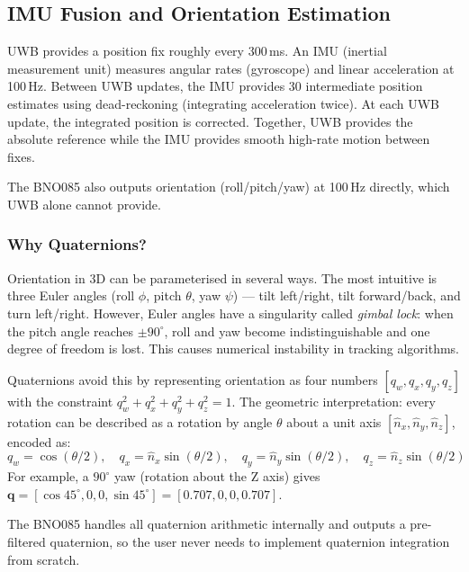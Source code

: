 \documentclass[11pt,a4paper]{article}
\newcommand{\vect}[1]{\bm{#1}}
\begin{document}
\subsection{IMU Fusion and Orientation Estimation}

\begin{intubox}
UWB provides a position fix roughly every 300\,ms. An IMU (inertial measurement unit) measures angular rates (gyroscope) and linear acceleration at 100\,Hz. Between UWB updates, the IMU provides 30 intermediate position estimates using dead-reckoning (integrating acceleration twice). At each UWB update, the integrated position is corrected. Together, UWB provides the absolute reference while the IMU provides smooth high-rate motion between fixes.

The BNO085 also outputs orientation (roll/pitch/yaw) at 100\,Hz directly, which UWB alone cannot provide.
\end{intubox}

\subsubsection{Why Quaternions?}

Orientation in 3D can be parameterised in several ways. The most intuitive is three Euler angles (roll $\phi$, pitch $\theta$, yaw $\psi$) --- tilt left/right, tilt forward/back, and turn left/right. However, Euler angles have a singularity called \emph{gimbal lock}: when the pitch angle reaches $\pm90^\circ$, roll and yaw become indistinguishable and one degree of freedom is lost. This causes numerical instability in tracking algorithms.

Quaternions avoid this by representing orientation as four numbers $[q_w, q_x, q_y, q_z]$ with the constraint $q_w^2 + q_x^2 + q_y^2 + q_z^2 = 1$. The geometric interpretation: every rotation can be described as a rotation by angle $\theta$ about a unit axis $[\hat{n}_x, \hat{n}_y, \hat{n}_z]$, encoded as:
\[
q_w = \cos(\theta/2), \quad q_x = \hat{n}_x \sin(\theta/2), \quad q_y = \hat{n}_y \sin(\theta/2), \quad q_z = \hat{n}_z \sin(\theta/2)
\]
For example, a $90^\circ$ yaw (rotation about the Z axis) gives $\vect{q} = [\cos 45^\circ, 0, 0, \sin 45^\circ] = [0.707, 0, 0, 0.707]$.

The BNO085 handles all quaternion arithmetic internally and outputs a pre-filtered quaternion, so the user never needs to implement quaternion integration from scratch.
\end{document}
